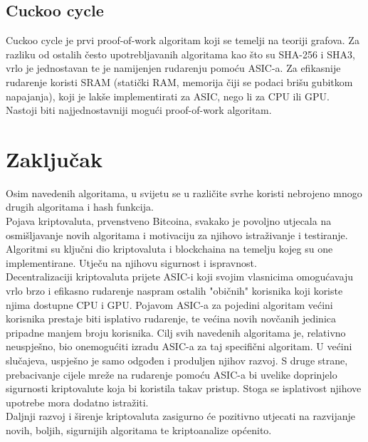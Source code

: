 \documentclass[12pt]{article}
\providecommand\phantomsection{}
\begin{document}
\subsection{Cuckoo cycle}
Cuckoo cycle je prvi proof-of-work algoritam koji se temelji na teoriji grafova. Za razliku od ostalih često upotrebljavanih algoritama kao što su SHA-256 i SHA3, vrlo je jednostavan te je namijenjen rudarenju pomoću ASIC-a. Za efikasnije rudarenje koristi SRAM (statički RAM, memorija čiji se podaci brišu gubitkom napajanja), koji je lakše implementirati za ASIC, nego li za CPU ili GPU.\\
Nastoji biti najjednostavniji mogući proof-of-work algoritam.
\cite{cuckoo}


\pagebreak
\section{Zaključak}
Osim navedenih algoritama, u svijetu se u različite svrhe koristi nebrojeno mnogo drugih algoritama i hash funkcija.\\
Pojava kriptovaluta, prvenstveno Bitcoina, svakako je povoljno utjecala na osmišljavanje novih algoritama i motivaciju za njihovo istraživanje i testiranje. \\
Algoritmi su ključni dio kriptovaluta i blockchaina na temelju kojeg su one implementirane. Utječu na njihovu sigurnost i ispravnost.\\
Decentralizaciji kriptovaluta prijete ASIC-i koji svojim vlasnicima omogućavaju vrlo brzo i efikasno rudarenje naspram ostalih "običnih" korisnika koji koriste njima dostupne CPU i GPU. Pojavom ASIC-a za pojedini algoritam većini korisnika prestaje biti isplativo rudarenje, te većina novih novčanih jedinica pripadne manjem broju korisnika. Cilj svih navedenih algoritama je, relativno neuspješno, bio onemogućiti izradu ASIC-a za taj specifični algoritam. U većini slučajeva, uspješno je samo odgođen i produljen njihov razvoj. S druge strane, prebacivanje cijele mreže na rudarenje pomoću ASIC-a bi uvelike doprinjelo sigurnosti kriptovalute koja bi koristila takav pristup.\cite{asic-plus} Stoga se isplativost njihove upotrebe mora dodatno istražiti.\\
Daljnji razvoj i širenje kriptovaluta zasigurno će pozitivno utjecati na razvijanje novih, boljih, sigurnijih algoritama te kriptoanalize općenito.


\pagebreak


\phantomsection
{}




	
\end{document}
